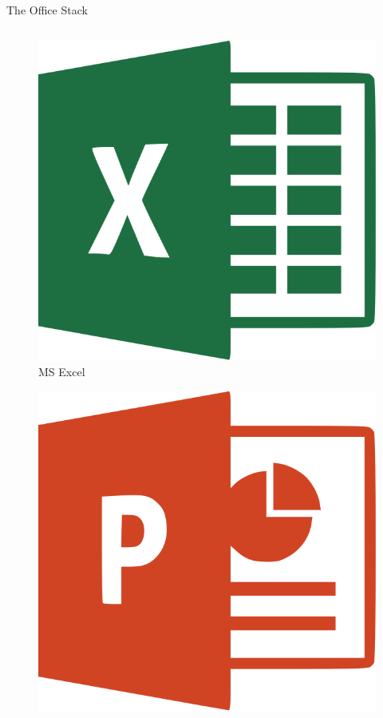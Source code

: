 \documentclass[10pt]{beamer}
\begin{document}
\begin{frame}{The Office Stack}
\begin{columns}
\begin{column}{0.33\textwidth}
\begin{figure}
                    \centering
                    \includegraphics[height=0.1\paperheight]{images/excel}
                    \caption{MS Excel}
                \end{figure}
                \begin{figure}
                    \centering
                    \includegraphics[height=0.1\paperheight]{images/powerpoint}

\end{figure}
\end{column}
\end{columns}
\end{frame}
\end{document}
